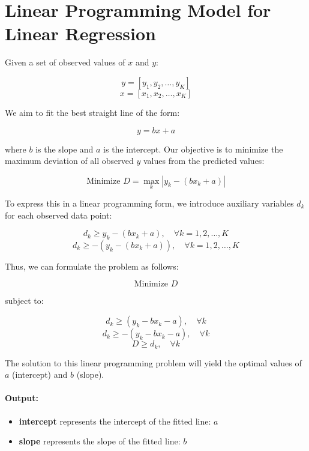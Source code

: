 \documentclass{article}
\begin{document}
\section*{Linear Programming Model for Linear Regression}

Given a set of observed values of \( x \) and \( y \):

\[
y = [y_{1}, y_{2}, \ldots, y_{K}]
\]
\[
x = [x_{1}, x_{2}, \ldots, x_{K}]
\]

We aim to fit the best straight line of the form:

\[
y = bx + a
\]

where \( b \) is the slope and \( a \) is the intercept. Our objective is to minimize the maximum deviation of all observed \( y \) values from the predicted values:

\[
\text{Minimize } D = \max_{k} |y_{k} - (bx_{k} + a)|
\]

To express this in a linear programming form, we introduce auxiliary variables \( d_k \) for each observed data point:

\[
d_{k} \geq y_{k} - (bx_{k} + a), \quad \forall k = 1, 2, \ldots, K
\]
\[
d_{k} \geq -(y_{k} - (bx_{k} + a)), \quad \forall k = 1, 2, \ldots, K
\]

Thus, we can formulate the problem as follows:

\[
\text{Minimize } D
\]

subject to:

\[
d_{k} \geq (y_{k} - bx_{k} - a), \quad \forall k
\]
\[
d_{k} \geq -(y_{k} - bx_{k} - a), \quad \forall k
\]
\[
D \geq d_{k}, \quad \forall k
\]

The solution to this linear programming problem will yield the optimal values of \( a \) (intercept) and \( b \) (slope).

\paragraph{Output:}
\begin{itemize}
    \item \textbf{intercept} represents the intercept of the fitted line: \( a \)
    \item \textbf{slope} represents the slope of the fitted line: \( b \)
\end{itemize}
\end{document}

